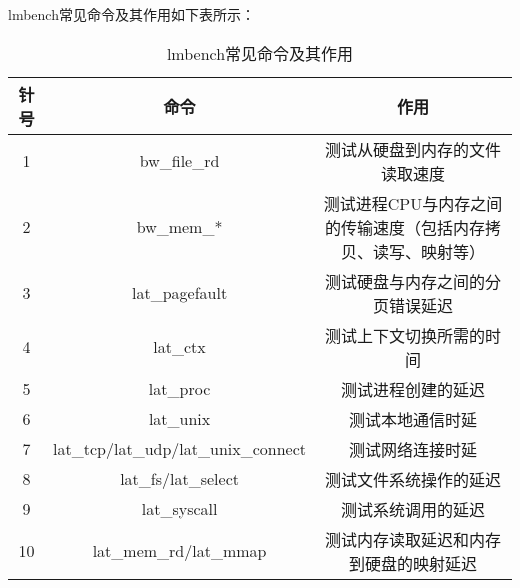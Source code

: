lmbench常见命令及其作用如下表所示：

\begin{table}[!ht]
	\centering
	\begin{tabular}{|c|c|c|}
		\hline
		\textbf{针号} & \textbf{命令} & \textbf{作用} \\
		\hline
		1 & bw_file_rd & 测试从硬盘到内存的文件读取速度 \\
		2 & bw_mem_* & 测试进程CPU与内存之间的传输速度（包括内存拷贝、读写、映射等）\\
		3 & lat_pagefault & 测试硬盘与内存之间的分页错误延迟 \\
		4 & lat_ctx & 测试上下文切换所需的时间 \\
		5 & lat_proc & 测试进程创建的延迟 \\
		6 & lat_unix & 测试本地通信时延 \\
		7 & lat_tcp/lat_udp/lat_unix_connect & 测试网络连接时延 \\
		8 & lat_fs/lat_select & 测试文件系统操作的延迟 \\
		9 & lat_syscall &  测试系统调用的延迟\\
		10 & lat_mem_rd/lat_mmap & 测试内存读取延迟和内存到硬盘的映射延迟 \\
		\hline
	\end{tabular}
	\caption{lmbench常见命令及其作用}
	\label{lmbench常见命令及其作用}
\end{table}